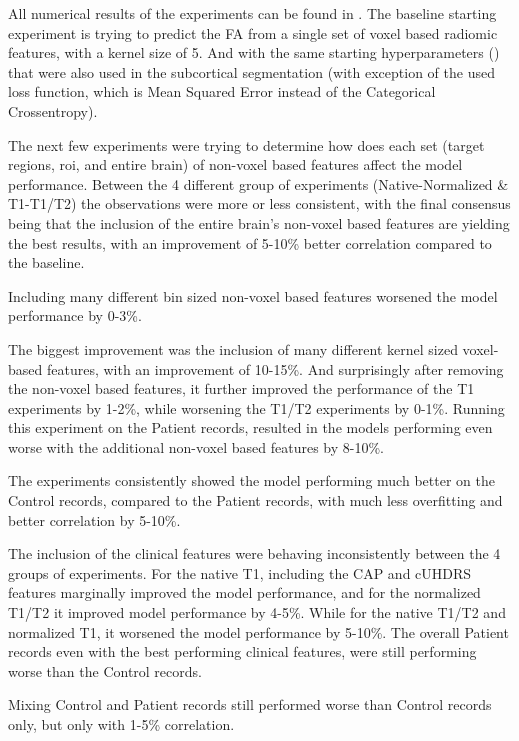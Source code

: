 All numerical results of the experiments can be found in  .
The baseline starting experiment is trying to predict the \ac{FA} from a single set of voxel based radiomic features, with a kernel size of 5. And with the same starting hyperparameters () that were also used in the subcortical segmentation (with exception of the used loss function, which is Mean Squared Error instead of the Categorical Crossentropy).\par
The next few experiments were trying to determine how does each set (target regions, roi, and entire brain) of non-voxel based features affect the model performance. Between the 4 different group of experiments (Native-Normalized \& T1-T1/T2) the observations were more or less consistent, with the final consensus being that the inclusion of the entire brain's non-voxel based features are yielding the best results, with an improvement of 5-10\% better correlation compared to the baseline.\par
Including many different bin sized non-voxel based features worsened the model performance by 0-3\%.\par
The biggest improvement was the inclusion of many different kernel sized voxel-based features, with an improvement of 10-15\%. And surprisingly after removing the non-voxel based features, it further improved the performance of the T1 experiments by 1-2\%, while worsening the T1/T2 experiments by 0-1\%. Running this experiment on the Patient records, resulted in the models performing even worse with the additional non-voxel based features by 8-10\%.\par
The experiments consistently showed the model performing much better on the Control records, compared to the Patient records, with much less overfitting and better correlation by 5-10\%.\par
The inclusion of the clinical features were behaving inconsistently between the 4 groups of experiments. For the native T1, including the \ac{CAP} and \ac{cUHDRS} features marginally improved the model performance, and for the normalized T1/T2 it improved model performance by 4-5\%. While for the native T1/T2 and normalized T1, it worsened the model performance by 5-10\%. The overall Patient records even with the best performing clinical features, were still performing worse than the Control records.\par
Mixing Control and Patient records still performed worse than Control records only, but only with 1-5\% correlation.\par
